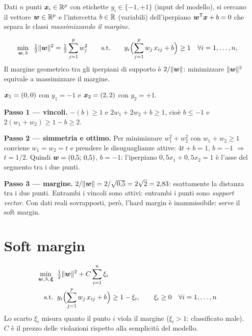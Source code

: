 Dati $n$ punti $\boldsymbol{x}_i \in \mathbb{R}^p$ con etichette $y_i \in \{-1, +1\}$ (input del
modello), si cercano il vettore $\boldsymbol{w} \in \mathbb{R}^p$ e l'intercetta $b \in \mathbb{R}$
(variabili) dell'iperpiano $\boldsymbol{w}^{\mathsf T} \boldsymbol{x} + b = 0$ che separa le classi
\emph{massimizzando il margine}.

\begin{modello}
\[
\min_{\boldsymbol{w},\, b}\;\; \tfrac12 \|\boldsymbol{w}\|^2 = \tfrac12 \sum_{j=1}^{p} w_j^2
\qquad \text{s.t.} \qquad
y_i \Bigl( \sum_{j=1}^{p} w_j\, x_{ij} + b \Bigr) \ge 1 \quad \forall i = 1, \dots, n ,
\]
Il margine geometrico tra gli iperpiani di supporto è $2/\|\boldsymbol{w}\|$: minimizzare
$\|\boldsymbol{w}\|^2$ equivale a massimizzare il margine.
\end{modello}

\begin{esempio}
$\boldsymbol{x}_1 = (0,0)$ con $y_1 = -1$ e $\boldsymbol{x}_2 = (2,2)$ con $y_2 = +1$.

\textbf{Passo 1 — vincoli.} $-(b) \ge 1$ e $2w_1 + 2w_2 + b \ge 1$, cioè
$b \le -1$ e $2(w_1 + w_2) \ge 1 - b \ge 2$.

\textbf{Passo 2 — simmetria e ottimo.} Per minimizzare $w_1^2 + w_2^2$ con
$w_1 + w_2 \ge 1$ conviene $w_1 = w_2 = t$ e prendere le disuguaglianze attive:
$4t + b = 1$, $b = -1$ $\Rightarrow$ $t = 1/2$. Quindi $\boldsymbol{w} = (0{,}5;\, 0{,}5)$,
$b = -1$: l'iperpiano $0{,}5x_1 + 0{,}5x_2 = 1$ è l'asse del segmento tra i due punti.

\textbf{Passo 3 — margine.} $2/\|\boldsymbol{w}\| = 2/\sqrt{0{,}5} = 2\sqrt 2 = 2{,}83$: esattamente
la distanza tra i due punti. Entrambi i vincoli sono attivi: entrambi i punti sono
\emph{support vector}. Con dati reali sovrapposti, però, l'hard margin è
inammissibile: serve il soft margin.
\end{esempio}

\section{Soft margin}

\begin{modello}
\begin{align*}
\min_{\boldsymbol{w},\, b,\, \boldsymbol{\xi}}\;\; & \tfrac12\|\boldsymbol{w}\|^2 + C \sum_{i=1}^{n} \xi_i \\
\text{s.t.}\;\; & y_i \Bigl( \sum_{j=1}^{p} w_j\, x_{ij} + b \Bigr) \ge 1 - \xi_i, \qquad \xi_i \ge 0 \quad \forall i = 1, \dots, n
\end{align*}
Lo scarto $\xi_i$ misura quanto il punto $i$ viola il margine ($\xi_i > 1$:
classificato male). $C$ è il prezzo delle violazioni rispetto alla semplicità del
modello.
\end{modello}

